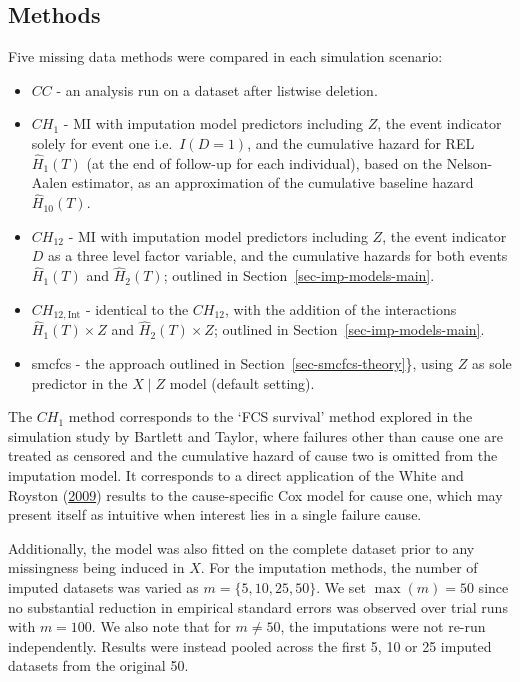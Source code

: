 \documentclass[
  letterpaper,
  DIV=11,
  numbers=noendperiod]{scrreprt}
\begin{document}
\hypertarget{methods}{%
\subsection{Methods}\label{methods}}

Five missing data methods were compared in each simulation scenario:

\begin{itemize}
\item
  \(CC\) - an analysis run on a dataset after listwise deletion.
\item
  \(CH_{1}\) - MI with imputation model predictors including \(Z\), the
  event indicator solely for event one i.e.~\(I(D = 1)\), and the
  cumulative hazard for REL \(\hat{H}_{1}(T)\) (at the end of follow-up
  for each individual), based on the Nelson-Aalen estimator, as an
  approximation of the cumulative baseline hazard \(\hat{H}_{10}(T)\).
\item
  \(CH_{12}\) - MI with imputation model predictors including \(Z\), the
  event indicator \(D\) as a three level factor variable, and the
  cumulative hazards for both events \(\hat{H}_{1}(T)\) and
  \(\hat{H}_{2}(T)\); outlined in Section~\ref{sec-imp-models-main}.
\item
  \(CH_{12,\text{Int}}\) - identical to the \(CH_{12}\), with the
  addition of the interactions \(\hat{H}_{1}(T) \times Z\) and
  \(\hat{H}_{2}(T) \times Z\); outlined in
  Section~\ref{sec-imp-models-main}.
\item
  smcfcs - the approach outlined in Section~\ref{sec-smcfcs-theory}\},
  using \(Z\) as sole predictor in the \(X \mid Z\) model (default
  setting).
\end{itemize}

The \(CH_{1}\) method corresponds to the `FCS survival' method explored
in the simulation study by Bartlett and Taylor, where failures other
than cause one are treated as censored and the cumulative hazard of
cause two is omitted from the imputation model. It corresponds to a
direct application of the White and Royston
(\protect\hyperlink{ref-whiteImputingMissingCovariate2009}{2009})
results to the cause-specific Cox model for cause one, which may present
itself as intuitive when interest lies in a single failure cause.

Additionally, the model was also fitted on the complete dataset prior to
any missingness being induced in \(X\). For the imputation methods, the
number of imputed datasets was varied as \(m = \{5, 10, 25, 50\}\). We
set \(\max(m) = 50\) since no substantial reduction in empirical
standard errors was observed over trial runs with \(m = 100\). We also
note that for \(m \neq 50\), the imputations were not re-run
independently. Results were instead pooled across the first 5, 10 or 25
imputed datasets from the original 50.
\end{document}
